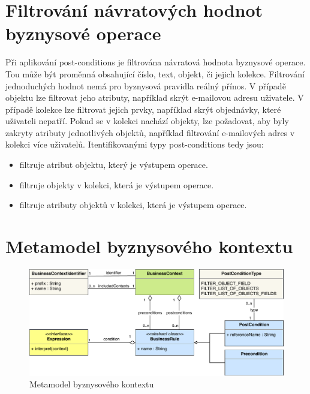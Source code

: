 \section{Filtrování návratových hodnot byznysové operace}

Při aplikování post-conditions je filtrována návratová hodnota byznysové operace. Tou může být proměnná
obsahující číslo, text, objekt, či jejich kolekce. Filtrování jednoduchých hodnot nemá pro byznysová pravidla reálný přínos.
V případě objektu lze filtrovat jeho atributy, například skrýt e-mailovou adresu uživatele.
V případě kolekce lze filtrovat jejich prvky, například skrýt objednávky, které uživateli nepatří.
Pokud se v kolekci nachází objekty, lze požadovat, aby byly zakryty atributy jednotlivých objektů,
například filtrování e-mailových adres v kolekci více uživatelů. Itentifikovanými typy post-conditions tedy jsou:

\begin{itemize}
    \item {} filtruje atribut objektu, který je výstupem operace.
    \item {} filtruje objekty v kolekci, která je výstupem operace.
    \item {} filtruje atributy objektů v kolekci, která je výstupem operace.
\end{itemize}

\section{Metamodel byznysového kontextu}\label{sec:metamodel}

\begin{figure}
    \centering
    \includegraphics[keepaspectratio=true, width=\linewidth]{figures/business-context-metamodel.pdf}
    \caption{Metamodel byznysového kontextu}
    \label{fig:business-context-metamodel}
\end{figure}

